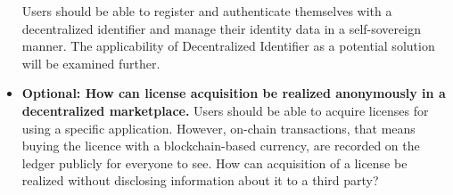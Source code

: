 \begin{itemize}
    Users should be able to register and authenticate themselves with a decentralized identifier and manage their identity data in a self-sovereign manner. The applicability of Decentralized Identifier as a potential solution will be examined further.
    \item \textbf{Optional: How can license acquisition be realized anonymously in a decentralized marketplace.}  \newline
    Users should be able to acquire licenses for using a specific application. However, on-chain transactions, that means buying the licence with a blockchain-based currency, are recorded on the ledger publicly for everyone to see. How can acquisition of a license be realized without disclosing information about it to a third party?
\end{itemize}
